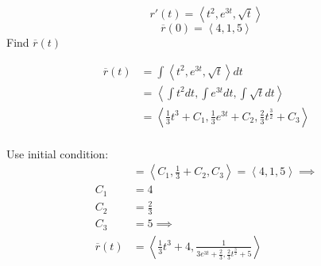 \begin{example}[Integral]
	\[r'(t) = \left<t^2, e^{3t}, \sqrt{t}  \right>\]
	\[\overline{r}(0) = \left<4, 1, 5 \right>\]
	Find $\overline{r}(t)$

	\begin{align*}
		\overline{r}(t) &= \int \left<t^2, e^{3t}, \sqrt{t}  \right> dt\\
		&= \left<\int t^2 dt, \int e^{3t} dt, \int \sqrt{t} dt \right> \\
		&= \left<\frac{1}{3} t^3 + C_1, \frac{1}{3} e^{3t} + C_2, \frac{2}{3} t^{\frac{3}{2}} + C_3\right> \\
	\end{align*}

	Use initial condition:
	\begin{align*}
		&= \left< C_1, \frac{1}{3} + C_2, C_3 \right> = \left<4, 1, 5 \right> \implies\\
		C_1 &= 4 \\
		C_2 &=  \frac{2}{3} \\
		C_3 &=  5 \implies \\
		\overline{r}(t) &= \boxed{\left<\frac{1}{3} t^3 + 4, \frac{1}{3 e^{3t} + \frac{2}{3}, \frac{2}{3} t^{\frac{3}{2}}+ 5} \right>} \\
	\end{align*}
\end{example}



\newpage


